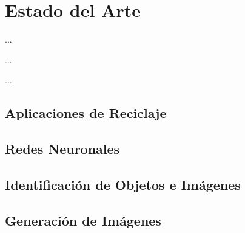 %
%

\chapter{Estado del Arte}

\begin{FraseCelebre}
\begin{Frase}
...
\end{Frase}
\begin{Fuente}
...
\end{Fuente}
\end{FraseCelebre}

\begin{resumen}
...
\end{resumen}

\section{Aplicaciones de Reciclaje}
\label{cap1:sec:aplicaciones-reciclaje}

\section{Redes Neuronales}
\label{cap1:sec:redes-neuronales}


\section{Identificación de Objetos e Imágenes}
\label{cap1:sec:identificacion}


\section{Generación de Imágenes}
\label{cap1:sec:generacion}


